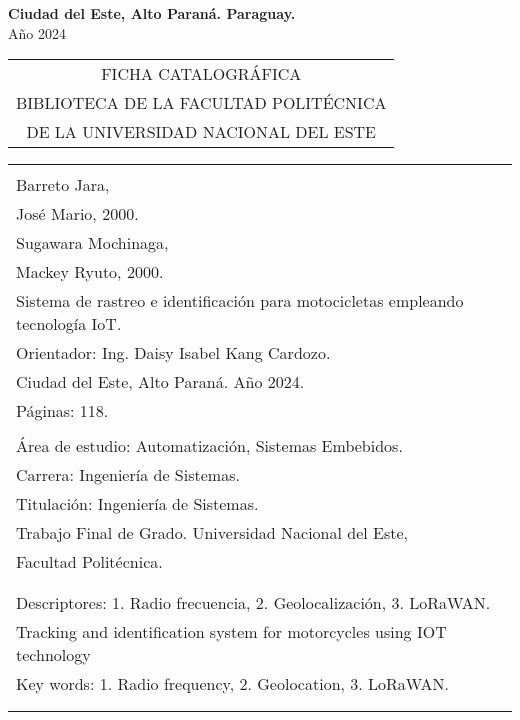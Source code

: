 \vspace{3.0cm}
\begin{center}
{\large {\bf Ciudad del Este, Alto Paraná. Paraguay.}\\[6mm]
Año 2024}
\end{center}
\newpage \normalsize
\thispagestyle{empty}
\begin{center} 
\begin{tabular}{c} 
  FICHA CATALOGRÁFICA \\
  BIBLIOTECA DE LA FACULTAD POLITÉCNICA \\
  DE LA UNIVERSIDAD NACIONAL DEL ESTE \\
\end{tabular} %
\vspace{0.3cm}

\begin{tabular}{|l|} \hline %
\\
Barreto Jara,\\
José Mario, 2000.\\
Sugawara Mochinaga,\\
Mackey Ryuto, 2000.\\
Sistema de rastreo e identificación para motocicletas empleando tecnología IoT.\\
Orientador: Ing. Daisy Isabel Kang Cardozo.\\
Ciudad del Este, Alto Paraná. Año 2024.\\
Páginas: 118.\\ 
\\
Área de estudio: Automatización, Sistemas Embebidos. \\
Carrera: Ingeniería de Sistemas. \\
Titulación: Ingeniería de Sistemas. \\
Trabajo Final de Grado. Universidad Nacional del Este, \\
Facultad Politécnica.\\
\\ \\
Descriptores: 1. Radio frecuencia, 2. Geolocalización, 3. LoRaWAN.\\
Tracking and identification system for motorcycles 
using IOT technology \\
Key words: 1. Radio frequency, 2. Geolocation, 3. LoRaWAN.\\

\\
\\
\hline
\end{tabular}
\end{center}


